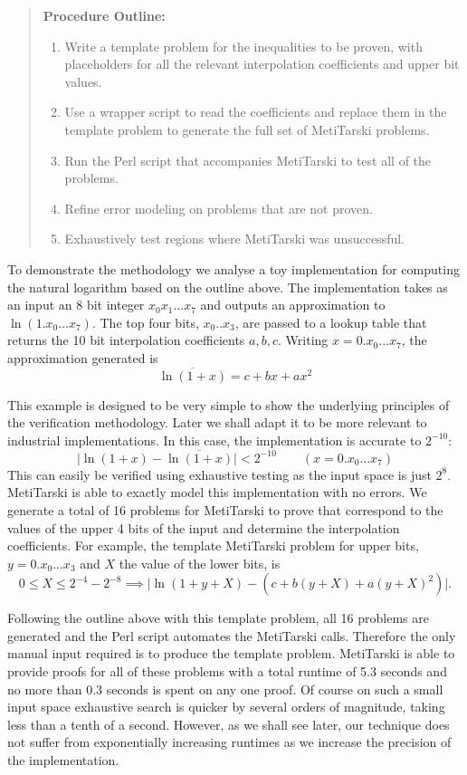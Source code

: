 \documentclass[a4]{article}
\newcommand{\abs}[1]{\lvert#1\rvert}
\begin{document}
\begin{quotation}
\textbf{Procedure Outline:}
\begin{enumerate}
\item Write a template problem for the inequalities to be proven, with placeholders for all the relevant interpolation coefficients and upper bit values.
\item Use a wrapper script to read the coefficients and replace them in the template problem to generate the full set of MetiTarski problems.
\item Run the Perl script that accompanies MetiTarski to test all of the problems.
\item Refine error modeling on problems that are not proven.
\item Exhaustively test regions where MetiTarski was unsuccessful.
\end{enumerate}  
\end{quotation}

To demonstrate the methodology we analyse a toy implementation for computing the natural logarithm based on the outline above. The implementation takes as an input an 8 bit integer $x_0x_1...x_7$ and outputs an approximation to $\ln(1.x_0...x_7)$. The top four bits, $x_0..x_3$, are passed to a lookup table that returns the 10 bit interpolation coefficients $a, b, c$. Writing $x=0.x_0...x_7$, the approximation generated is
$$ \overline{\ln(1+x)}=c + bx +ax^2 $$

This example is designed to be very simple to show the underlying principles of the verification methodology. Later we shall adapt it to be more relevant to industrial implementations. In this case, the implementation is accurate to $2^{-10}$:
$$\abs{\ln(1+x)-\overline{\ln(1+x)}} <2^{-10} \qquad (x= 0.x_0...x_7) $$
This can easily be verified using exhaustive testing as the input space is just $2^8$. MetiTarski is able to exactly model this implementation with no errors. We generate a total of 16 problems for MetiTarski to prove that correspond to the values of the upper 4 bits of the input and determine the interpolation coefficients. For example, the template MetiTarski problem for upper bits, $y=0.x_0...x_3$ and $X$ the value of the lower bits, is
$$ 0\le X \le 2^{-4}-2^{-8} \implies \abs{\ln(1+y+X)-(c+b(y+X)+a(y+X)^2)}. $$

Following the outline above with this template problem, all 16 problems are generated and the Perl script automates the MetiTarski calls. Therefore the only manual input required is to produce the template problem. MetiTarski is able to provide proofs for all of these problems with a total runtime of 5.3 seconds and no more than 0.3 seconds is spent on any one proof. Of course on such a small input space exhaustive search is quicker by several orders of magnitude, taking less than a tenth of a second. However, as we shall see later, our technique does not suffer from exponentially increasing runtimes as we increase the precision of the implementation.
\end{document}

